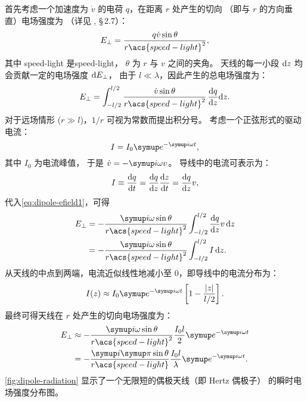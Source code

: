首先考虑一个加速度为 $\dot{v}$ 的电荷 $q$，在距离 $r$ 处产生的切向
（即与 $r$ 的方向垂直）电场强度为
（详见 , \S\,2.7）：
\begin{equation}
  \label{eq:q-efield}
  E_{\perp} = \frac{q \dot{v} \sin\theta}{r \acs{speed-light}^2} ,
\end{equation}
其中
\acs{speed-light} 是\acl{speed-light}，
$\theta$ 为 $r$ 与 $v$ 之间的夹角。
天线的每一小段 $\mathrm{d}z$ 均会贡献一定的电场强度 $\mathrm{d}E_{\perp}$，
由于 $l \ll \lambda$，因此产生的总电场强度为：
\begin{equation}
  \label{eq:dipole-efield1}
  E_{\perp} = \int_{-l/2}^{l/2}
    \frac{\dot{v} \sin\theta}{r \acs{speed-light}^2} \,\diff{q}{z}\D{z} .
\end{equation}
对于远场情形 ($r \gg l$)，$1/r$ 可视为常数而提出积分号。
考虑一个正弦形式的驱动电流：
\begin{equation}
  \label{eq:dipole-current}
  I = I_0 \Ce^{-\Ci \omega t} ,
\end{equation}
其中 $I_0$ 为电流峰值，
于是 $\dot{v} = -\Ci \omega v$。
导线中的电流可表示为：
\begin{equation}
  \label{eq:wire-current}
  I \equiv \frac{\mathrm{d}q}{\mathrm{d}t} = \frac{\mathrm{d}q}{\mathrm{d}z} \frac{\mathrm{d}z}{\mathrm{d}t} = \frac{\mathrm{d}q}{\mathrm{d}z} v ,
\end{equation}
代入\autoref{eq:dipole-efield1}，可得
\begin{align}
  \label{eq:dipole-efield2}
  E_{\perp}
    & = -\frac{\Ci\omega \sin\theta}{r \acs{speed-light}^2}
      \int_{-l/2}^{l/2} \diff{q}{z} v \,\D{z} \\
    & = -\frac{\Ci\omega \sin\theta}{r \acs{speed-light}^2}
      \int_{-l/2}^{l/2} I\,\D{z} .
\end{align}
从天线的中点到两端，电流近似线性地减小至 0，即导线中的电流分布为：
\begin{equation}
  \label{eq:dipole-current-dist}
  I(z) \approx I_0 \Ce^{-\Ci\omega t}
    \left[ 1 - \frac{|z|}{l/2} \right] .
\end{equation}
最终可得天线在 $r$ 处产生的切向电场强度为：
\begin{align}
  E_{\perp}
    & \approx -\frac{\Ci\omega \sin\theta}{r \acs{speed-light}^2}
      \frac{I_0 l}{2} \Ce^{-\Ci\omega t} \\
    & = -\frac{\Ci\Cpi \sin\theta}{r \acs{speed-light}}
      \frac{I_0 l}{\lambda} \Ce^{-\Ci\omega t} .
    \label{eq:dipole-efield}
\end{align}
\autoref{fig:dipole-radiation} 显示了一个无限短的偶极天线（即 Hertz 偶极子）
的瞬时电场强度分布图。

